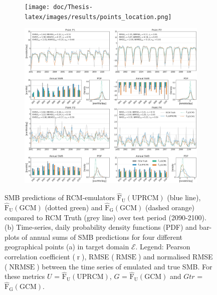 \documentclass[a4paper,11pt,oneside]{report}
\begin{document}
\begin{figure}[!h]
        \centering
        \begin{subfigure}[b]{0.2\columnwidth}
            \centering \texttt{[image: doc/Thesis-latex/images/results/points\_location.png]}
            \caption[]%
            {{\small}}    
          \label{fig:points-location}
        \end{subfigure}
        \hfill
        \begin{subfigure}[b]{\columnwidth}  
            \centering 
           \includegraphics[width=\textwidth]{doc/Thesis-latex/images/results/timeseries_RCM_GCM.pdf}
            \caption[]%
            {{\small }}  
          \label{fig:timeseries-GCM-UPRCM}
        \end{subfigure}
        \hfill
        \caption[]
        {\small SMB predictions of RCM-emulators $\mathrm{\hat{F}_{U}(UPRCM)}$ (blue line), $\mathrm{\hat{F}_{U}(GCM)}$ (dotted green) and $\mathrm{\mathrm{\hat{F}_{G}(GCM)}}$ (dashed orange) compared to RCM Truth (grey line) over test period (2090-2100). 
        (b) Time-series, daily probability density functions (PDF) and bar-plots of annual sums of SMB predictions for four different geographical points (a) in target domain $\mathcal{E}$.
        Legend: Pearson correlation coefficient ($\operatorname{r}$), RMSE ($\operatorname{RMSE}$) and normalised RMSE ($\operatorname{NRMSE}$) between the time series of emulated and true SMB. For these metrics $U$ = $\mathrm{\hat{F}_{U}(UPRCM)}$, $G$ = $\mathrm{\hat{F}_{U}(GCM)}$ and $Gtr$ = $\mathrm{\hat{F}_{G}(GCM)}$.} 
        \label{fig:points-timeseries-GCM-UPRCM}
    \end{figure}
\end{document}
